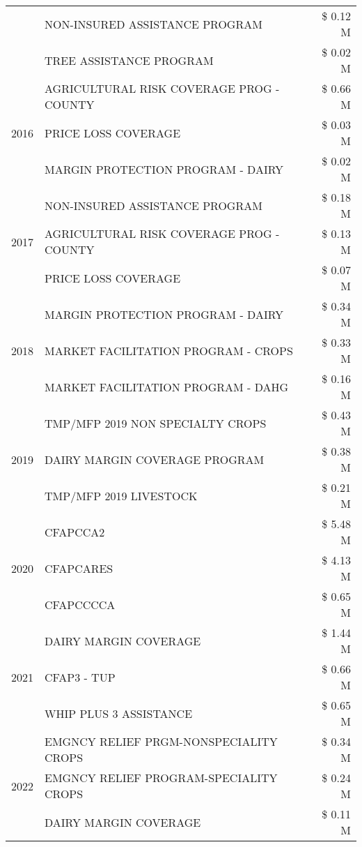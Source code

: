\begin{tabular}{llr}
 & NON-INSURED ASSISTANCE PROGRAM & \$ 0.12 M \\
 & TREE ASSISTANCE PROGRAM & \$ 0.02 M \\
\cline{1-3}
\multirow[t]{3}{*}{2016} & AGRICULTURAL RISK COVERAGE PROG - COUNTY & \$ 0.66 M \\
 & PRICE LOSS COVERAGE & \$ 0.03 M \\
 & MARGIN PROTECTION PROGRAM - DAIRY & \$ 0.02 M \\
\cline{1-3}
\multirow[t]{3}{*}{2017} & NON-INSURED ASSISTANCE PROGRAM & \$ 0.18 M \\
 & AGRICULTURAL RISK COVERAGE PROG - COUNTY & \$ 0.13 M \\
 & PRICE LOSS COVERAGE & \$ 0.07 M \\
\cline{1-3}
\multirow[t]{3}{*}{2018} & MARGIN PROTECTION PROGRAM - DAIRY & \$ 0.34 M \\
 & MARKET FACILITATION PROGRAM - CROPS & \$ 0.33 M \\
 & MARKET FACILITATION PROGRAM - DAHG & \$ 0.16 M \\
\cline{1-3}
\multirow[t]{3}{*}{2019} & TMP/MFP 2019 NON SPECIALTY CROPS & \$ 0.43 M \\
 & DAIRY MARGIN COVERAGE PROGRAM & \$ 0.38 M \\
 & TMP/MFP 2019 LIVESTOCK & \$ 0.21 M \\
\cline{1-3}
\multirow[t]{3}{*}{2020} & CFAPCCA2 & \$ 5.48 M \\
 & CFAPCARES & \$ 4.13 M \\
 & CFAPCCCCA & \$ 0.65 M \\
\cline{1-3}
\multirow[t]{3}{*}{2021} & DAIRY MARGIN COVERAGE & \$ 1.44 M \\
 & CFAP3 - TUP & \$ 0.66 M \\
 & WHIP PLUS 3 ASSISTANCE & \$ 0.65 M \\
\cline{1-3}
\multirow[t]{3}{*}{2022} & EMGNCY RELIEF PRGM-NONSPECIALITY CROPS & \$ 0.34 M \\
 & EMGNCY RELIEF PROGRAM-SPECIALITY CROPS & \$ 0.24 M \\
 & DAIRY MARGIN COVERAGE & \$ 0.11 M \\
\cline{1-3}
\bottomrule
\end{tabular}

